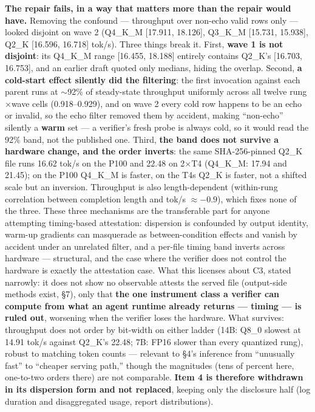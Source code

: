 \begin{enumerate}
\textbf{The repair fails, in a way that matters more than the repair would have.} Removing the confound --- throughput over non-echo valid rows only --- looked disjoint on wave 2 (Q4\_K\_M [17.911, 18.126], Q3\_K\_M [15.731, 15.938], Q2\_K [16.596, 16.718] tok/s). Three things break it. First, \textbf{wave 1 is not disjoint}: its Q4\_K\_M range [16.455, 18.188] entirely contains Q2\_K's [16.703, 16.753], and an earlier draft quoted only medians, hiding the overlap. Second, \textbf{a cold-start effect silently did the filtering}: the first invocation against each parent runs at $\sim$92\% of steady-state throughput uniformly across all twelve rung$\times$wave cells (0.918--0.929), and on wave 2 every cold row happens to be an echo or invalid, so the echo filter removed them by accident, making ``non-echo'' silently a \textbf{warm} set --- a verifier's fresh probe is always cold, so it would read the 92\% band, not the published one. Third, \textbf{the band does not survive a hardware change, and the order inverts}: the same SHA-256-pinned Q2\_K file runs 16.62 tok/s on the P100 and 22.48 on 2$\times$T4 (Q4\_K\_M: 17.94 and 21.45); on the P100 Q4\_K\_M is faster, on the T4s Q2\_K is faster, not a shifted scale but an inversion. Throughput is also length-dependent (within-rung correlation between completion length and tok/s $\approx -0.9$), which fixes none of the three. These three mechanisms are the transferable part for anyone attempting timing-based attestation: dispersion is confounded by output identity, warm-up gradients can masquerade as between-condition effects and vanish by accident under an unrelated filter, and a per-file timing band inverts across hardware --- structural, and the case where the verifier does not control the hardware is exactly the attestation case. What this licenses about C3, stated narrowly: it does not show no observable attests the served file (output-side methods exist, \S7), only that \textbf{the one instrument class a verifier can compute from what an agent runtime already returns --- timing --- is ruled out}, worsening when the verifier loses the hardware. What survives: throughput does not order by bit-width on either ladder (14B: Q8\_0 slowest at 14.91 tok/s against Q2\_K's 22.48; 7B: FP16 slower than every quantized rung), robust to matching token counts --- relevant to \S4's inference from ``unusually fast'' to ``cheaper serving path,'' though the magnitudes (tens of percent here, one-to-two orders there) are not comparable. \textbf{Item 4 is therefore withdrawn in its dispersion form and not replaced}, keeping only the disclosure half (log duration and disaggregated usage, report distributions).


\end{enumerate}
